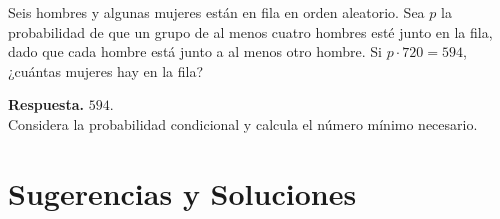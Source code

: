 \documentclass[11pt]{scrartcl}
\begin{document}
\begin{problem}[AIME 2011]
Seis hombres y algunas mujeres están en fila en orden aleatorio. Sea \( p \) la probabilidad de que un grupo de al menos cuatro hombres esté junto en la fila, dado que cada hombre está junto a al menos otro hombre. Si \( p \cdot 720 = 594 \), ¿cuántas mujeres hay en la fila?
\begin{hint}
\textbf{Respuesta.} \( 594 \).\\

Considera la probabilidad condicional y calcula el número mínimo necesario.
\end{hint}
\end{problem}


\section{Sugerencias y Soluciones}
\begin{enumerate}

\end{enumerate}
\end{document}
